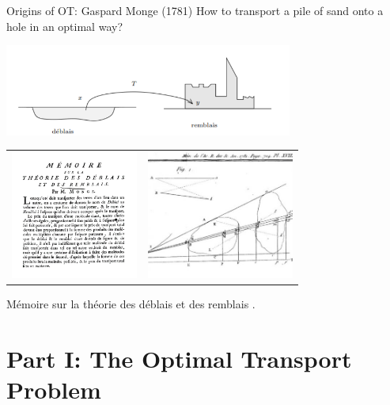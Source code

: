 \documentclass[pdf,aspectratio=169,10pt]{beamer}
\begin{document}
\begin{frame}{Origins of OT: Gaspard Monge (1781)}
How to transport a pile of sand onto a hole in an optimal way?

  \begin{center}
  \includegraphics[height=3cm]{../img/deblais}\vspace{0.2cm}
  \begin{tabular}{cc}
\includegraphics[height=4.2cm]{../img/monge0}& \includegraphics[height=4.2cm]{../img/monge1781} \\
  \end{tabular}
  
  \end{center}
{\tiny Mémoire sur la théorie des déblais et des remblais \cite{monge1781memoire}.}
\end{frame}



\section{Part I: The Optimal Transport Problem}


\begin{frame}
    \Large {}
\end{frame}
\end{document}
